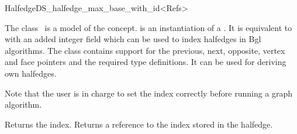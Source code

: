 
\ccRefPageBegin



\begin{ccRefClass}{HalfedgeDS_halfedge_max_base_with_id<Refs>}

\ccDefinition
  
The class \ccRefName\ is a model of the 
concept.  is an instantiation of a . 
It is equivalent to  with an added integer
field which can be used to index halfedges in {\sc Bgl} algorithms.
The class contains support for the previous, next, opposite, vertex and 
face pointers and the required type definitions.
It can be used for deriving own halfedges.

Note that the user is in charge to set the index correctly before
running a graph algorithm.



\ccIsModel


\ccCreation
{}


{Returns the index.}
\ccGlue
{}
{Returns a reference to the index stored in the halfedge.}

\ccSeeAlso

\\
\\
\\
\\
\\
\\
\\
\\
\\
\\

\end{ccRefClass}

\ccRefPageEnd

